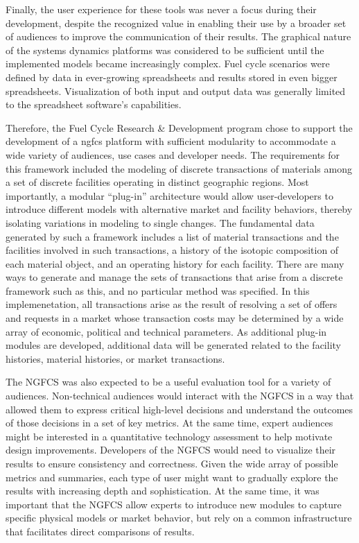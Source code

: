 Finally, the user experience for these tools was never a focus during their
development, despite the recognized value in enabling their use by a broader
set of audiences to improve the communication of their results.  The graphical
nature of the systems dynamics platforms was considered to be sufficient until
the implemented models became increasingly complex.  Fuel cycle scenarios were
defined by data in ever-growing spreadsheets and results stored in even bigger
spreadsheets.  Visualization of both input and output data was generally
limited to the spreadsheet software's capabilities.

Therefore, the Fuel Cycle Research \& Development program chose to support the
development of a \gls{ngfcs} platform with sufficient modularity to
accommodate a wide variety of audiences, use cases and developer needs. The
requirements for this framework included the modeling of discrete transactions
of materials among a set of discrete facilities operating in distinct
geographic regions.  Most importantly, a modular
“plug-in” architecture would allow user-developers to introduce different
models with alternative market and facility behaviors, thereby isolating
variations in modeling to single changes. The fundamental data generated by
such a framework includes a list of material transactions and the facilities
involved in such transactions, a history of the isotopic composition of each
material object, and an operating history for each facility. There are many
ways to generate and manage the sets of transactions that arise from a
discrete framework such as this, and no particular method was specified.  In
this implemenetation, all transactions arise as the result of resolving a set
of offers and requests in a market whose transaction costs may be determined
by a wide array of economic, political and technical parameters. As additional
plug-in modules are developed, additional data will be generated related to
the facility histories, material histories, or market transactions.

The NGFCS was also expected to be a useful evaluation tool for a variety of
audiences.  Non-technical audiences would interact with the NGFCS in a way
that allowed them to express critical high-level decisions and understand the
outcomes of those decisions in a set of key metrics. At the same time, expert
audiences might be interested in a quantitative technology assessment to help
motivate design improvements. Developers of the NGFCS would need to visualize
their results to ensure consistency and correctness. Given the wide array of
possible metrics and summaries, each type of user might want to gradually
explore the results with increasing depth and sophistication. At the same
time, it was important that the NGFCS allow experts to introduce new modules
to capture specific physical models or market behavior, but rely on a common
infrastructure that facilitates direct comparisons of results.

